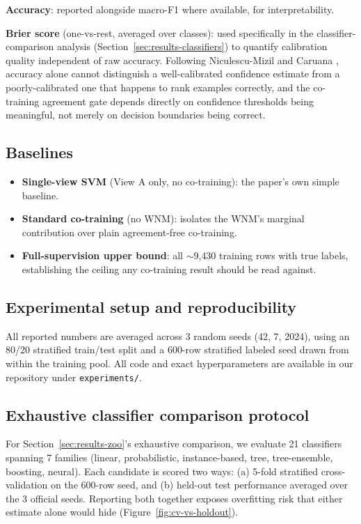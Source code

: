 \documentclass[conference]{IEEEtran}
\begin{document}
\textbf{Accuracy}: reported alongside macro-F1 where available, for
interpretability.

\textbf{Brier score} (one-vs-rest, averaged over classes): used specifically
in the classifier-comparison analysis (Section~\ref{sec:results-classifiers})
to quantify calibration quality independent of raw accuracy. Following
Niculescu-Mizil and Caruana \citep{niculescumizil2005predicting}, accuracy
alone cannot distinguish a well-calibrated confidence estimate from a
poorly-calibrated one that happens to rank examples correctly, and the
co-training agreement gate depends directly on confidence thresholds being
meaningful, not merely on decision boundaries being correct.

\subsection{Baselines}

\begin{itemize}
  \item \textbf{Single-view SVM} (View A only, no co-training): the paper's
        own simple baseline.
  \item \textbf{Standard co-training} (no WNM): isolates the WNM's marginal
        contribution over plain agreement-free co-training.
  \item \textbf{Full-supervision upper bound}: all $\sim$9{,}430 training
        rows with true labels, establishing the ceiling any co-training
        result should be read against.
\end{itemize}

\subsection{Experimental setup and reproducibility}

All reported numbers are averaged across 3 random seeds (42, 7, 2024), using
an 80/20 stratified train/test split and a 600-row stratified labeled seed
drawn from within the training pool. All code and exact hyperparameters are
available in our repository \citep{pmvcwnm_repo} under \texttt{experiments/}.

\subsection{Exhaustive classifier comparison protocol}

For Section~\ref{sec:results-zoo}'s exhaustive comparison, we evaluate 21
classifiers spanning 7 families (linear, probabilistic, instance-based, tree,
tree-ensemble, boosting, neural). Each candidate is scored two ways: (a)
5-fold stratified cross-validation on the 600-row seed, and (b) held-out test
performance averaged over the 3 official seeds. Reporting both together
exposes overfitting risk that either estimate alone would hide
(Figure~\ref{fig:cv-vs-holdout}).
\end{document}
